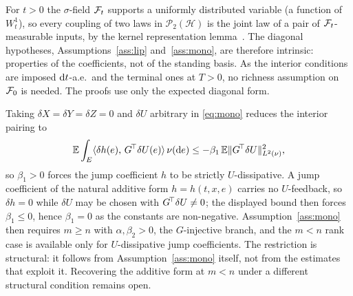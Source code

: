 \begin{remark}\label{rem:intrinsic}
For $t>0$ the $\sigma$-field $\mathcal{F}_t$ supports a uniformly distributed variable (a
function of $W^1_t$), so every coupling of two laws in $\mathcal P_2(\mathcal H)$ is
the joint law of a pair of $\mathcal{F}_t$-measurable
inputs, by the kernel representation lemma~\cite[Lemma~4.22]{Kallenberg}. The diagonal hypotheses,
Assumptions~\ref{ass:lip} and~\ref{ass:mono}, are therefore intrinsic: properties of
the coefficients, not of the standing basis. As the interior conditions are imposed
$\mathrm{d} t$-a.e.\ and the terminal ones at $T>0$, no richness assumption on $\mathcal{F}_0$ is
needed. The proofs use only the expected diagonal form.
\end{remark}
\begin{remark}\label{rem:beta1-dich}
Taking $\delta X=\delta Y=\delta Z=0$ and $\delta U$ arbitrary in \eqref{eq:mono} reduces the
interior pairing to
\[
\mathbb{E}\int_E\langle \delta h(e),\,G^{\!\top}\delta U(e)\rangle\,\nu(\mathrm{d} e)
\le-\beta_1\,\mathbb{E}\lVert G^{\!\top}\delta U\rVert_{L^2(\nu)}^2 ,
\]
so $\beta_1>0$ forces the jump coefficient $h$ to be strictly $U$-dissipative. A jump
coefficient of the natural additive form $h=h(t,x,e)$ carries no $U$-feedback, so
$\delta h=0$ while $\delta U$ may be chosen with $G^{\!\top}\delta U\neq0$; the displayed bound
then forces $\beta_1\le0$, hence $\beta_1=0$ as the constants are non-negative.
Assumption~\ref{ass:mono} then requires $m\ge n$ with $\alpha,\beta_2>0$, the
$G$-injective branch, and the $m<n$ rank case is available only for $U$-dissipative jump
coefficients.
The restriction is structural: it follows from Assumption~\ref{ass:mono} itself, not from
the estimates that exploit it. Recovering the additive form at $m<n$ under a different
structural condition remains open.
\end{remark}
